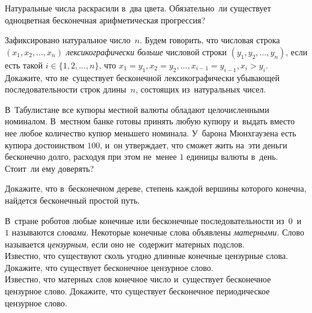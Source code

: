


\begin{problems}

\item
Натуральные числа раскрасили в~два цвета.
Обязательно~ли существует одноцветная бесконечная арифметическая прогрессия?

\item
Зафиксировано натуральное число~$n$.
Будем говорить, что числовая строка $(x_{1}, x_{2}, \ldots, x_{n})$
\emph{лексикографически больше}
числовой строки $(y_{1}, y_{2}, \ldots, y_{n})$, если есть такой
$i \in \{ 1, 2, \ldots, n \}$, что
$x_{1} = y_{1}, x_{2} = y_{2}, \ldots, x_{i-1} = y_{i-1}, x_{i} > y_{i}$.
\\
Докажите, что не~существует бесконечной лексикографически
убывающей последовательности строк длины~$n$, состоящих из~натуральных чисел.

\item
В~Табулистане все купюры местной валюты обладают целочисленными номиналом.
В~местном банке готовы принять любую купюру и~выдать вместо нее любое
количество купюр меньшего номинала.
У~барона Мюнхгаузена есть купюра достоинством $100$, и~он утверждает, что
сможет жить на~эти деньги бесконечно долго, расходуя при этом не~менее $1$
единицы валюты в~день.
Стоит~ли ему доверять?

\item
{}
Докажите, что в~бесконечном дереве, степень каждой вершины которого конечна,
найдется бесконечный простой путь.

\item
В~стране роботов любые конечные или бесконечные последовательности из~$0$~и~$1$
называются \emph{словами}.
Некоторые конечные слова объявлены \emph{матерными.}
Слово называется \emph{цензурным,} если оно не~содержит матерных подслов.
\\
\subproblem
Известно, что существуют сколь угодно длинные конечные цензурные слова.
Докажите, что существует бесконечное цензурное слово.
\\
\subproblem
Известно, что матерных слов конечное число и~существует бесконечное цензурное
слово.
Докажите, что существует бесконечное периодическое цензурное слово.


\end{problems}
